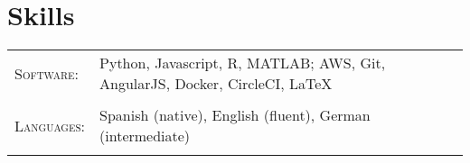 \documentclass[a4paper,10pt]{article}
\begin{document}
\begin{tabularx}{\textwidth}{Xr}

\end{tabularx}








\section{Skills}
\begin{tabularx}{\textwidth}{lX}
\textsc{Software:}& Python, Javascript, R, MATLAB; AWS, Git, AngularJS, Docker, CircleCI, \LaTeX \\ \\ 
 \textsc{Languages:}& Spanish (native), English (fluent), German (intermediate)\\ \\ 
\end{tabularx}

% 
\end{document}
